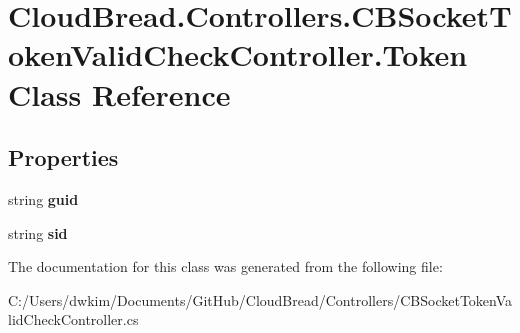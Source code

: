 \hypertarget{a00108}{}\section{Cloud\+Bread.\+Controllers.\+C\+B\+Socket\+Token\+Valid\+Check\+Controller.\+Token Class Reference}
\label{a00108}
\subsection*{Properties}
\begin{DoxyCompactItemize}
\item 
string {\bfseries guid}\hypertarget{a00108_a6e46ed9d636a9e5afdc189d44e738ccf}{}\label{a00108_a6e46ed9d636a9e5afdc189d44e738ccf}

\item 
string {\bfseries sid}\hypertarget{a00108_aaf0ca77f3fd48f56906e74d0b7fe8a05}{}\label{a00108_aaf0ca77f3fd48f56906e74d0b7fe8a05}

\end{DoxyCompactItemize}


The documentation for this class was generated from the following file\+:\begin{DoxyCompactItemize}
\item 
C\+:/\+Users/dwkim/\+Documents/\+Git\+Hub/\+Cloud\+Bread/\+Controllers/C\+B\+Socket\+Token\+Valid\+Check\+Controller.\+cs\end{DoxyCompactItemize}
